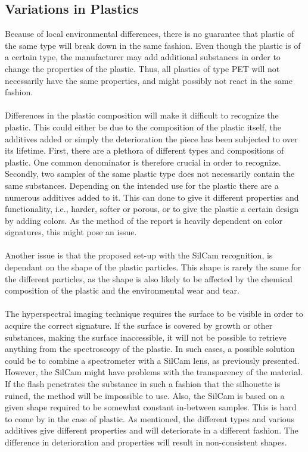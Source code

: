 \subsection{Variations in Plastics}
Because of local environmental differences, there is no guarantee that plastic of the same type will break down in the same fashion. Even though the plastic is of a certain type, the manufacturer may add additional substances in order to change the properties of the plastic. Thus, all plastics of type PET will not necessarily have the same properties, and might possibly not react in the same fashion.
\\\\
Differences in the plastic composition will make it difficult to recognize the plastic. This could either be due to the composition of the plastic itself, the additives added or simply the deterioration the piece has been subjected to over its lifetime. First, there are a plethora of different types and compositions of plastic. One common denominator is therefore crucial in order to recognize. Secondly, two samples of the same plastic type does not necessarily contain the same substances. Depending on the intended use for the plastic there are a numerous additives added to it. This can done to give it different properties and functionality, i.e., harder, softer or porous, or to give the plastic a certain design by adding colors. As the method of the report is heavily dependent on color signatures, this might pose an issue. 
\\\\
Another issue is that the proposed set-up with the SilCam recognition, is dependant on the shape of the plastic particles. This shape is rarely the same for the different particles, as the shape is also likely to be affected by the chemical composition of the plastic and the environmental wear and tear.
\\\\
The hyperspectral imaging technique requires the surface to be visible in order to acquire the correct signature. If the surface is covered by growth or other substances, making the surface inaccessible, it will not be possible to retrieve anything from the spectroscopy of the plastic. In such cases, a possible solution could be to combine a spectrometer with a SilCam lens, as previously presented. However, the SilCam might have problems with the transparency of the material. If the flash penetrates the substance in such a fashion that the silhouette is ruined, the method will be impossible to use. Also, the SilCam is based on a given shape required to be somewhat constant in-between samples. This is hard to come by in the case of plastic. As mentioned, the different types and various additives give different properties and will deteriorate in a different fashion. The difference in deterioration and properties will result in non-consistent shapes.
